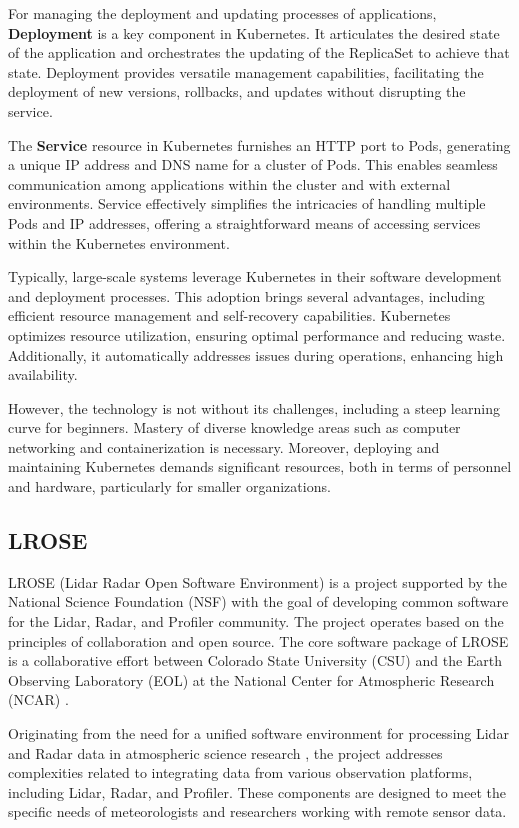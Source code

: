 For managing the deployment and updating processes of applications, \textbf{Deployment} is a key component in Kubernetes. It articulates the desired state of the application and orchestrates the updating of the ReplicaSet to achieve that state. Deployment provides versatile management capabilities, facilitating the deployment of new versions, rollbacks, and updates without disrupting the service.

The \textbf{Service} resource in Kubernetes furnishes an HTTP port to Pods, generating a unique IP address and DNS name for a cluster of Pods. This enables seamless communication among applications within the cluster and with external environments. Service effectively simplifies the intricacies of handling multiple Pods and IP addresses, offering a straightforward means of accessing services within the Kubernetes environment.

Typically, large-scale systems leverage Kubernetes in their software development and deployment processes. This adoption brings several advantages, including efficient resource management and self-recovery capabilities. Kubernetes optimizes resource utilization, ensuring optimal performance and reducing waste. Additionally, it automatically addresses issues during operations, enhancing high availability.

However, the technology is not without its challenges, including a steep learning curve for beginners. Mastery of diverse knowledge areas such as computer networking and containerization is necessary. Moreover, deploying and maintaining Kubernetes demands significant resources, both in terms of personnel and hardware, particularly for smaller organizations.

\subsection{LROSE}

LROSE (Lidar Radar Open Software Environment) is a project supported by the National Science Foundation (NSF) with the goal of developing common software for the Lidar, Radar, and Profiler community. The project operates based on the principles of collaboration and open source. The core software package of LROSE is a collaborative effort between Colorado State University (CSU) and the Earth Observing Laboratory (EOL) at the National Center for Atmospheric Research (NCAR) \cite{lrose}.

Originating from the need for a unified software environment for processing Lidar and Radar data in atmospheric science research \cite{lrose}, the project addresses complexities related to integrating data from various observation platforms, including Lidar, Radar, and Profiler. These components are designed to meet the specific needs of meteorologists and researchers working with remote sensor data.

